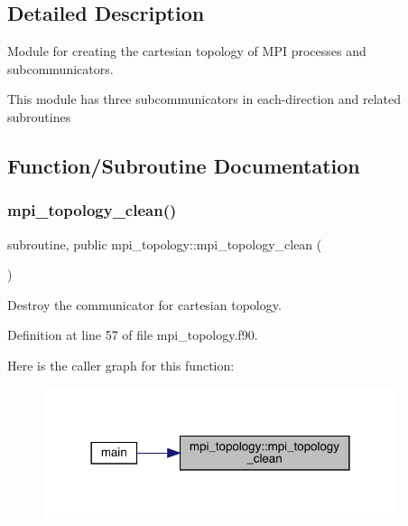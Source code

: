 \subsection{Detailed Description}
Module for creating the cartesian topology of M\+PI processes and subcommunicators. 

This module has three subcommunicators in each-\/direction and related subroutines 

\subsection{Function/\+Subroutine Documentation}
\mbox{\label{namespacempi__topology_aa14e91baaec6d1c1082ebd5ac6e19128}} 
\subsubsection{\texorpdfstring{mpi\_topology\_clean()}{mpi\_topology\_clean()}}
{\footnotesize\ttfamily subroutine, public mpi\+\_\+topology\+::mpi\+\_\+topology\+\_\+clean (\begin{DoxyParamCaption}{ }\end{DoxyParamCaption})}



Destroy the communicator for cartesian topology. 



Definition at line 57 of file mpi\+\_\+topology.\+f90.

Here is the caller graph for this function\+:
\nopagebreak
\begin{figure}[H]
\begin{center}
\leavevmode
\includegraphics[width=294pt]{namespacempi__topology_aa14e91baaec6d1c1082ebd5ac6e19128_icgraph}
\end{center}
\end{figure}
\mbox{\label{namespacempi__topology_a8819f16f50aded913f17520a29d3ec4c}} 
